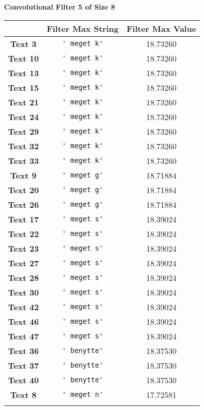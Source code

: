 \textbf{Convolutional Filter 5 of Size 8}\par\medskip
\begin{tabular}{c|cc}
    & \textbf{Filter Max String} & \textbf{Filter Max Value} \\ \hline
    \textbf{Text 3} & \verb{' meget k'{ & 18.73260 \\
    \textbf{Text 10} & \verb{' meget k'{ & 18.73260 \\
    \textbf{Text 13} & \verb{' meget k'{ & 18.73260 \\
    \textbf{Text 15} & \verb{' meget k'{ & 18.73260 \\
    \textbf{Text 21} & \verb{' meget k'{ & 18.73260 \\
    \textbf{Text 24} & \verb{' meget k'{ & 18.73260 \\
    \textbf{Text 29} & \verb{' meget k'{ & 18.73260 \\
    \textbf{Text 32} & \verb{' meget k'{ & 18.73260 \\
    \textbf{Text 33} & \verb{' meget k'{ & 18.73260 \\
    \textbf{Text 9} & \verb{' meget g'{ & 18.71884 \\
    \textbf{Text 20} & \verb{' meget g'{ & 18.71884 \\
    \textbf{Text 26} & \verb{' meget g'{ & 18.71884 \\
    \textbf{Text 17} & \verb{' meget s'{ & 18.39024 \\
    \textbf{Text 22} & \verb{' meget s'{ & 18.39024 \\
    \textbf{Text 23} & \verb{' meget s'{ & 18.39024 \\
    \textbf{Text 27} & \verb{' meget s'{ & 18.39024 \\
    \textbf{Text 28} & \verb{' meget s'{ & 18.39024 \\
    \textbf{Text 30} & \verb{' meget s'{ & 18.39024 \\
    \textbf{Text 42} & \verb{' meget s'{ & 18.39024 \\
    \textbf{Text 46} & \verb{' meget s'{ & 18.39024 \\
    \textbf{Text 47} & \verb{' meget s'{ & 18.39024 \\
    \textbf{Text 36} & \verb{' benytte'{ & 18.37530 \\
    \textbf{Text 37} & \verb{' benytte'{ & 18.37530 \\
    \textbf{Text 40} & \verb{' benytte'{ & 18.37530 \\
    \textbf{Text 8} & \verb{' meget n'{ & 17.72581 \\
}}}}}}}}}}}}}}}}}}}}}}}}}
\end{tabular}
